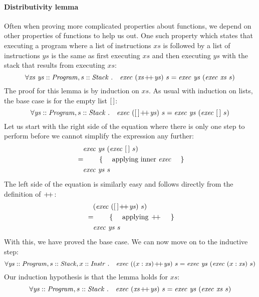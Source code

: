 \paragraph{Distributivity lemma} Often when proving more complicated properties about functions, we depend on other properties of functions to help us out. One such property which states that executing a program where a list of instructions $\mathit{xs}$ is followed by a list of instructions $\mathit{ys}$ is the same as first executing $\mathit{xs}$ and then executing $\mathit{ys}$ with the stack that results from executing $\mathit{xs}$:
\begin{displaymath}
\forall \mathit{xs}~\mathit{ys} :: \mathit{Program}, s :: \mathit{Stack} ~.\quad \mathit{exec}~(\mathit{xs} \append \mathit{ys})~s = \mathit{exec}~\mathit{ys}~(\mathit{exec}~\mathit{xs}~s)
\end{displaymath}
The proof for this lemma is by induction on $\mathit{xs}$. As usual with induction on lists, the base case is for the empty list $\hslist{}$:
\begin{displaymath}
\forall \mathit{ys} :: \mathit{Program}, s :: \mathit{Stack} ~.\quad \mathit{exec}~(\hslist{} \append \mathit{ys})~s = \mathit{exec}~\mathit{ys}~(\mathit{exec}~\hslist{}~s)
\end{displaymath}
Let us start with the right side of the equation where there is only one step to perform before we cannot simplify the expression any further:
\begin{align*}
\expr{\mathit{exec}~\mathit{ys}~(\mathit{exec}~\hslist{}~s)}
\hint{applying inner $\mathit{exec}$}
\lastexpr{\mathit{exec}~\mathit{ys}~s}
\end{align*}
The left side of the equation is similarly easy and follows directly from the definition of $\append$:
\begin{align*}
\expr{(\mathit{exec}~(\hslist{} \append \mathit{ys})~s)}
\hint{applying $\append$}
\lastexpr{\mathit{exec}~\mathit{ys}~s}
\end{align*}
With this, we have proved the base case. We can now move on to the inductive step:
\begin{displaymath}
\forall \mathit{ys} :: \mathit{Program}, s :: \mathit{Stack}, x :: \mathit{Instr} ~.\quad \mathit{exec}~((x:\mathit{xs}) \append \mathit{ys})~s = \mathit{exec}~\mathit{ys}~(\mathit{exec}~(x:\mathit{xs})~s)
\end{displaymath}
Our induction hypothesis is that the lemma holds for $\mathit{xs}$:
\begin{displaymath}
\forall \mathit{ys} :: \mathit{Program}, s :: \mathit{Stack} ~.\quad \mathit{exec}~(\mathit{xs} \append \mathit{ys})~s = \mathit{exec}~\mathit{ys}~(\mathit{exec}~\mathit{xs}~s)
\end{displaymath}

